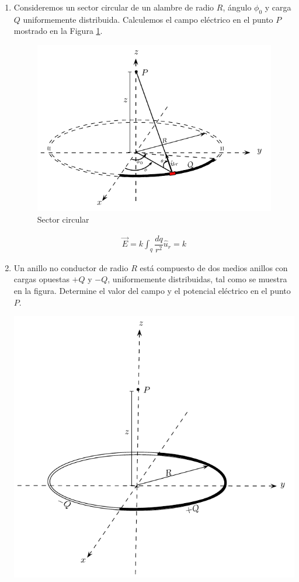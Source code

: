 \begin{enumerate}
\item Consideremos un sector circular de un alambre de radio $R$, ángulo $\phi_{0}$ y carga $Q$ uniformemente distribuida. Calculemos el campo eléctrico en el punto $P$ mostrado en la Figura \ref{figsectorcircular}.  

\begin{figure}[h]
\begin{center}
\includegraphics[scale=1.0]{electrostatica/sectorcircular}
\end{center}
\caption{Sector circular}
\label{figsectorcircular}
\end{figure}

\begin{eqnarray}
\vec{E}= k \int_q \dfrac{dq}{r^{2}}\hat{u}_r = k
\end{eqnarray}

\item Un anillo no conductor de radio $R$ está compuesto de dos medios anillos con cargas opuestas $+Q$ y $-Q$, uniformemente distribuidas, tal como se muestra en la figura. Determine el valor del campo y el potencial eléctrico en el punto $P$.

\includegraphics[scale=0.6]{electrostatica/mediosanillos}



\end{enumerate}
